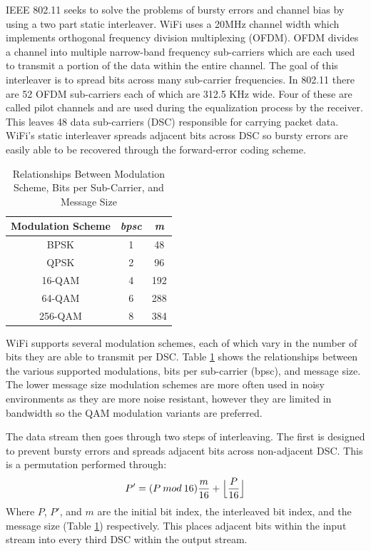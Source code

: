 \documentclass[sigconf]{acmart}
\begin{document}
IEEE 802.11 seeks to solve the problems of bursty errors and channel bias by using a two part static interleaver\cite{vo2016interleaving}. WiFi uses a 20MHz channel width which implements orthogonal frequency division multiplexing (OFDM). OFDM divides a channel into multiple narrow-band frequency sub-carriers which are each used to transmit a portion of the data within the entire channel. The goal of this interleaver is to spread bits across many sub-carrier frequencies. In 802.11 there are 52 OFDM sub-carriers each of which are 312.5 KHz wide\cite{kapp2002802}. Four of these are called pilot channels and are used during the equalization process by the receiver. This leaves 48 data sub-carriers (DSC) responsible for carrying packet data. WiFi's static interleaver spreads adjacent bits across DSC so bursty errors are easily able to be recovered through the forward-error coding scheme. 

\begin{table}[ht] 
\begin{tabular}{ccc}
\textbf{Modulation Scheme} & \textit{bpsc} & \textit{m} \\ \hline
BPSK                       & 1             & 48         \\
QPSK                       & 2             & 96         \\
16-QAM                     & 4             & 192        \\
64-QAM                     & 6             & 288        \\
256-QAM                    & 8             & 384       
\end{tabular}
\caption{Relationships Between Modulation Scheme, Bits per Sub-Carrier, and Message Size\cite{vo2016interleaving}}
\label{tab:802Info}
\end{table}


WiFi supports several modulation schemes, each of which vary in the number of bits they are able to transmit per DSC. Table \ref{tab:802Info} shows the relationships between the various supported modulations, bits per sub-carrier (bpsc), and message size. The lower message size modulation schemes are more often used in noisy environments as they are more noise resistant, however they are limited in bandwidth so the QAM modulation variants are preferred\cite{kapp2002802}.

The data stream then goes through two steps of interleaving. The first is designed to prevent bursty errors and spreads adjacent bits across non-adjacent DSC. This is a permutation performed through:
$$P'=(P\:mod\:16)\frac{m}{16} + \Bigl\lfloor{\frac{P}{16}}\Bigr\rfloor$$
Where $P$, $P'$, and $m$ are the initial bit index, the interleaved bit index, and the message size (Table \ref{tab:802Info}) respectively. This places adjacent bits within the input stream into every third DSC within the output stream\cite{vo2016interleaving}. 
\end{document}

